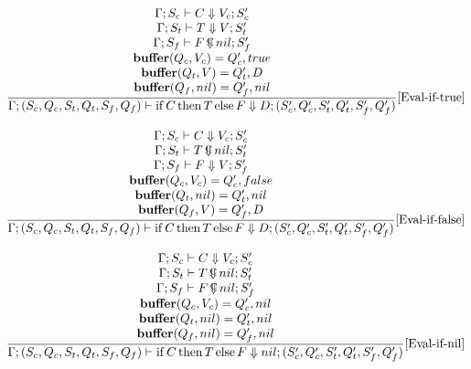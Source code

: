 \documentclass{scrartcl}
\DeclareMathOperator{\ifop}{if}
\DeclareMathOperator{\thenop}{then}
\DeclareMathOperator{\elseop}{else}
\DeclareMathOperator{\ceval}{\overset{C}{\smash{\Downarrow}}}
\DeclareMathOperator{\buffer}{\mathbf{buffer}}
\begin{document}
    \begin{align*}
    \frac{
        \begin{matrix}
        \Gamma; S_c \vdash C \Downarrow V_c; S_c' \\
        \Gamma; S_t \vdash T \Downarrow V; S_t' \\
        \Gamma; S_f \vdash F \ceval nil; S_f' \\
        \buffer(Q_c, V_c) = Q_c', true \\
        \buffer(Q_t, V) = Q_t', D \\
        \buffer(Q_f, nil) = Q_f', nil 
        \end{matrix}
    }{
        \Gamma; (S_c, Q_c, S_t, Q_t, S_f, Q_f) \vdash \ifop C \thenop T \elseop F \Downarrow D; (S_c', Q_c', S_t', Q_t', S_f', Q_f')
    }[\text{Eval-if-true}]
    \end{align*}
    
    \begin{align*}
    \frac{
        \begin{matrix}
        \Gamma; S_c \vdash C \Downarrow V_c; S_c' \\
        \Gamma; S_t \vdash T \ceval nil; S_t' \\
        \Gamma; S_f \vdash F \Downarrow V; S_f' \\
        \buffer(Q_c, V_c) = Q_c', false \\
        \buffer(Q_t, nil) = Q_t', nil \\
        \buffer(Q_f, V) = Q_f', D
        \end{matrix}
    }{
        \Gamma; (S_c, Q_c, S_t, Q_t, S_f, Q_f) \vdash \ifop C \thenop T \elseop F \Downarrow D; (S_c', Q_c', S_t', Q_t', S_f', Q_f')
    }[\text{Eval-if-false}]
    \end{align*}
    
    \begin{align*}
    \frac{
        \begin{matrix}
        \Gamma; S_c \vdash C \Downarrow V_c; S_c' \\
        \Gamma; S_t \vdash T \ceval nil; S_t' \\
        \Gamma; S_f \vdash F \ceval nil; S_f' \\
        \buffer(Q_c, V_c) = Q_c', nil \\
        \buffer(Q_t, nil) = Q_t', nil \\
        \buffer(Q_f, nil) = Q_f', nil
        \end{matrix}
    }{
        \Gamma; (S_c, Q_c, S_t, Q_t, S_f, Q_f) \vdash \ifop C \thenop T \elseop F \Downarrow nil; (S_c', Q_c', S_t', Q_t', S_f', Q_f')
    }[\text{Eval-if-nil}]
    \end{align*}
    
\end{document}
